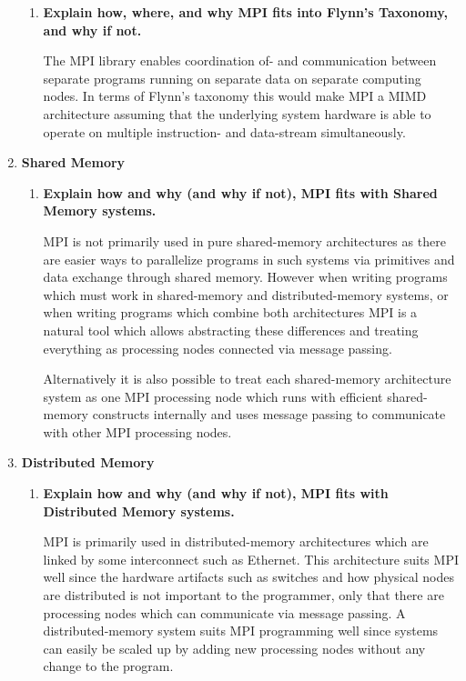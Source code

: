 \begin{enumerate}
\begin{enumerate}

\item \textbf{Explain how, where, and why MPI fits into Flynn's Taxonomy, and why if not.}

The \acf{MPI} library enables coordination of- and communication between separate programs running on separate data on separate computing nodes. In terms of Flynn's taxonomy this would make \ac{MPI} a \ac{MIMD} architecture assuming that the underlying system hardware is able to operate on multiple instruction- and data-stream simultaneously.

\end{enumerate}

\item \textbf{Shared Memory}

\begin{enumerate}

\item \textbf{Explain how and why (and why if not), MPI fits with Shared Memory systems.}

\ac{MPI} is not primarily used in pure shared-memory architectures as there are easier ways to parallelize programs in such systems via primitives and data exchange through shared memory. However when writing programs which must work in shared-memory and distributed-memory systems, or when writing programs which combine both architectures \ac{MPI} is a natural tool which allows abstracting these differences and treating everything as processing nodes connected via message passing.

Alternatively it is also possible to treat each shared-memory architecture system as one \ac{MPI} processing node which runs with efficient shared-memory constructs internally and uses message passing to communicate with other \ac{MPI} processing nodes.

\end{enumerate}

\item \textbf{Distributed Memory}

\begin{enumerate}

\item \textbf{Explain how and why (and why if not), MPI fits with Distributed Memory systems.}

\ac{MPI} is primarily used in distributed-memory architectures which are linked by some interconnect such as Ethernet. This architecture suits \ac{MPI} well since the hardware artifacts such as switches and how physical nodes are distributed is not important to the programmer, only that there are processing nodes which can communicate via message passing. A distributed-memory system suits \ac{MPI} programming well since systems can easily be scaled up by adding new processing nodes without any change to the program.

\end{enumerate}

\end{enumerate}

